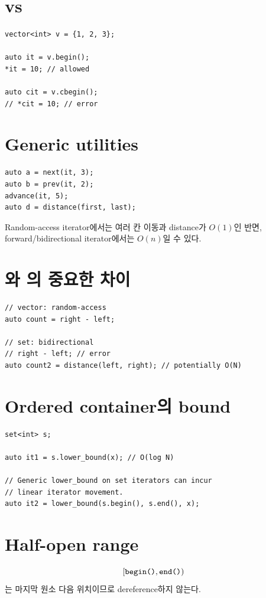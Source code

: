 \section{ vs }
\begin{lstlisting}
vector<int> v = {1, 2, 3};

auto it = v.begin();
*it = 10; // allowed

auto cit = v.cbegin();
// *cit = 10; // error
\end{lstlisting}

\section{Generic utilities}
\begin{lstlisting}
auto a = next(it, 3);
auto b = prev(it, 2);
advance(it, 5);
auto d = distance(first, last);
\end{lstlisting}

Random-access iterator에서는 여러 칸 이동과 distance가 $O(1)$인 반면, forward/bidirectional iterator에서는 $O(n)$일 수 있다.

\section{와 의 중요한 차이}
\begin{lstlisting}
// vector: random-access
auto count = right - left;

// set: bidirectional
// right - left; // error
auto count2 = distance(left, right); // potentially O(N)
\end{lstlisting}

\section{Ordered container의 bound}
\begin{lstlisting}
set<int> s;

auto it1 = s.lower_bound(x); // O(log N)

// Generic lower_bound on set iterators can incur
// linear iterator movement.
auto it2 = lower_bound(s.begin(), s.end(), x);
\end{lstlisting}

\section{Half-open range}
\[
[\texttt{begin()},\texttt{end()})
\]
는 마지막 원소 다음 위치이므로 dereference하지 않는다.

